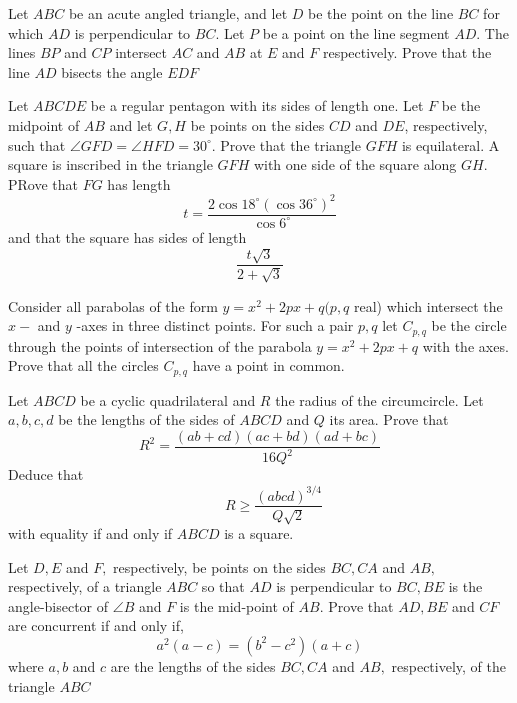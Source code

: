 \documentclass{pset}
\begin{document}
\begin{problems}
\begin{problem}[IrMO 2001 Q8]
    Let \(A B C\) be an acute angled triangle, and let \(D\) be the point on the line \(B C\) for which \(A D\) is perpendicular to \(B C .\) Let \(P\) be a point on the line segment \(A D .\) The lines \(B P\) and \(C P\) intersect \(A C\) and \(A B\) at \(E\) and \(F\) respectively. Prove that the line \(A D\) bisects the angle \(E D F\)
\end{problem}

\begin{problem}[IrMO 2000 Q2]
Let $ABCDE$ be a regular pentagon with its sides of length one.
Let $F$ be the midpoint of $AB$ and let $G, H$ be points on the sides $CD$ and $DE$, respectively,
such that $\angle GFD = \angle HFD = 30^{\circ}$.
Prove that the triangle $GFH$ is equilateral. A square is inscribed in the triangle $GFH$ with one side of the square along $GH$. PRove that $FG$ has length
$$
t=\frac{2 \cos 18^{\circ}\left(\cos 36^{\circ}\right)^{2}}{\cos 6^{\circ}}
$$
and that the square has sides of length
$$
\frac{t \sqrt{3}}{2+\sqrt{3}}
$$
\end{problem}

\begin{problem}[IrMO 2000 Q5]
    Consider all parabolas of the form \(y=x^{2}+2 p x+q(p, q\) real) which intersect the \(x-\) and \(y\) -axes in three distinct points. For such a pair \(p, q\) let \(C_{p, q}\) be the circle through the points of intersection of the parabola \(y=x^{2}+2 p x+q\) with the axes. Prove that all the circles \(C_{p, q}\) have a point in common.
\end{problem}

\begin{problem}[IrMO 2000 Q7]
    Let \(A B C D\) be a cyclic quadrilateral and \(R\) the radius of the circumcircle. Let \(a, b, c, d\) be the lengths of the sides of \(A B C D\) and \(Q\) its area. Prove that
    $$
    R^{2}=\frac{(a b+c d)(a c+b d)(a d+b c)}{16 Q^{2}}
    $$
    Deduce that 
    $$
    {\qquad R \geq \frac{(a b c d)^{3 / 4}}{Q \sqrt{2}}}
    $$
    with equality if and only if \(A B C D\) is a square.
\end{problem}

\begin{problem}[IrMO 1999 Q3]
    Let \(D, E\) and \(F,\) respectively, be points on the sides \(B C, C A\) and \(A B,\) respectively, of a triangle \(A B C\) so that \(A D\) is perpendicular to \(B C, B E\) is the angle-bisector of \(\angle B\) and \(F\) is the mid-point of \(A B .\) Prove that \(A D, B E\) and \(C F\) are concurrent if and only if,
    $$
    a^{2}(a-c)=\left(b^{2}-c^{2}\right)(a+c)
    $$
    where \(a, b\) and \(c\) are the lengths of the sides \(B C, C A\) and \(A B,\) respectively, of the triangle \(A B C\)
\end{problem}


\end{problems}
\end{document}
